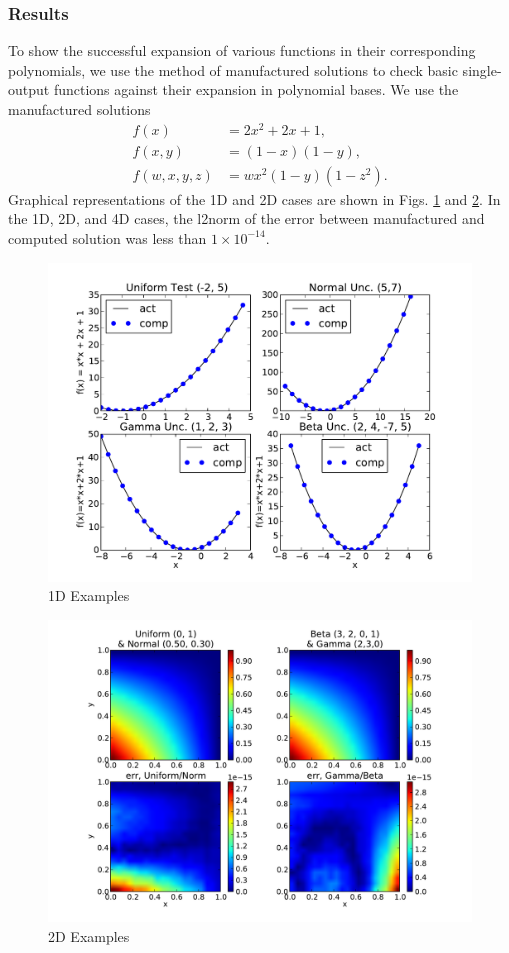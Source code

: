 \subsubsection{Results}
To show the successful expansion of various functions in their corresponding polynomials, we use the method of manufactured solutions to check basic single-output functions against their expansion in polynomial bases.  We use the manufactured solutions
\begin{align}
f(x)&=2x^2+2x+1,\\
f(x,y)&=(1-x)(1-y),\\
f(w,x,y,z)&=wx^2(1-y)(1-z^2).
\end{align}
Graphical representations of the 1D and 2D cases are shown in Figs. \ref{1Derr} and \ref{2Derr}.  In the 1D, 2D, and 4D cases, the l2norm of the error between manufactured and computed solution was less than $1\times10^{-14}$.
\begin{figure}[h!]
\centering
\includegraphics[width=0.7\linewidth]{./graphics/contDistErr}
\caption{1D Examples}
\label{1Derr}
\end{figure}

\begin{figure}[h!]
\centering
\includegraphics[width=0.7\linewidth]{./graphics/contDistErr2D}
\caption{2D Examples}
\label{2Derr}
\end{figure}

